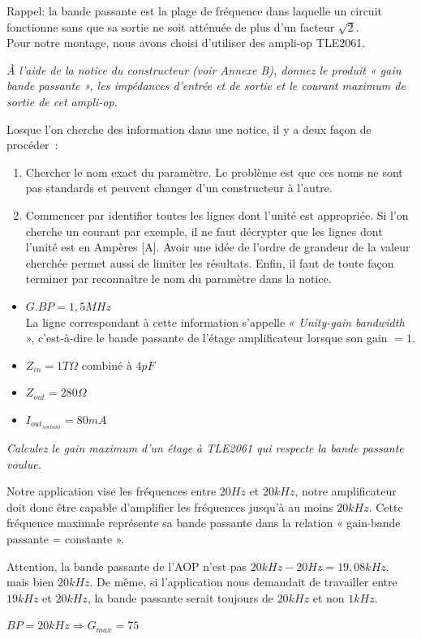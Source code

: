 Rappel: la bande passante est la plage de fréquence dans laquelle un circuit fonctionne sans que sa
sortie ne soit atténuée de plus d'un facteur $\sqrt{2}$.\\

Pour notre montage, nous avons choisi d'utiliser des ampli-op TLE2061.

{
\textit{À l’aide de la notice du constructeur (voir Annexe B), donnez le produit « gain bande passante », les impédances d'entrée et de sortie et le courant maximum de sortie de cet ampli-op.}
}
{%
Losque l'on cherche des information dans une notice, il y a deux façon de procéder~:
\begin{enumerate}
  \item Chercher le nom exact du paramètre.
  Le problème est que ces noms ne sont pas standards et peuvent changer d'un constructeur à l'autre.
  \item Commencer par identifier toutes les lignes dont l'unité est appropriée.
  Si l'on cherche un courant par exemple, il ne faut décrypter que les lignes dont l'unité est en Ampères [A].
  Avoir une idée de l'ordre de grandeur de la valeur cherchée permet aussi de limiter les résultats.
  Enfin, il faut de toute façon terminer par reconnaître le nom du paramètre dans la notice.
\end{enumerate}

\begin{itemize}
\item $G.BP = 1,5MHz$\\
La ligne correspondant à cette information s'appelle « \textit{Unity-gain bandwidth} », c'est-à-dire le bande passante de l'étage amplificateur lorsque son gain $= 1$.
\item $Z_{in} = 1 T\Omega \mbox{ combiné à } 4 pF$
\item $Z_{out}=280\Omega$
\item $I_{{out}_{sortant}}=80mA$
\end{itemize}
}

{
\textit{Calculez le gain maximum d'un étage à TLE2061 qui respecte la bande passante voulue.}
}
{%
Notre application vise les fréquences entre $20 Hz$ et $20 kHz$, notre amplificateur doit donc être capable d'amplifier les fréquences jusqu'à au moins $20 kHz$.
Cette fréquence maximale représente sa bande passante dans la relation « gain$\cdot$bande passante = constante ».

Attention, la bande passante de l'AOP n'est pas $20 kHz - 20 Hz = 19,08 kHz$, mais bien $20 kHz$. De même, si l'application nous demandait de travailler entre $19 kHz$ et $20 kHz$, la bande passante serait toujours de $20 kHz$ et non $1 kHz$.

$BP = 20kHz \Rightarrow G_{max} = 75$
}

